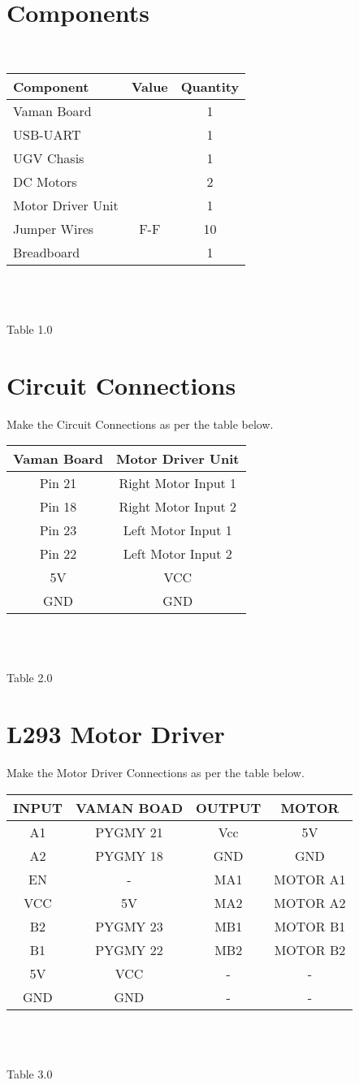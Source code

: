 \documentclass[journal,12pt,twocolumn]{IEEEtran}
\begin{document}
\section{Components}
\
\centering
\begin{tabular}{|l|c|c|}
\hline
Component & Value & Quantity\\
\hline
Vaman Board & & 1\\
\hline
USB-UART & & 1\\
\hline
UGV Chasis & & 1\\
\hline
DC Motors & & 2\\
\hline
Motor Driver Unit &  & 1\\
\hline
Jumper Wires & F-F & 10\\
\hline
Breadboard & & 1\\
\hline
\end{tabular}\\
\
\centerline{Table 1.0}

\section{Circuit Connections}
\raggedright
Make the Circuit Connections as per the table below.\\
\vspace{0.25cm}
\centering
\begin{tabular}{|c|c|}
\hline
Vaman Board & Motor Driver Unit\\
\hline
Pin 21 & Right Motor Input 1\\
\hline
Pin 18 & Right Motor Input 2\\
\hline
Pin 23 & Left Motor Input 1\\
\hline
Pin 22 & Left Motor Input 2\\
\hline
5V & VCC\\
\hline
GND & GND\\
\hline
\end{tabular}\\
\
\centerline{Table 2.0}
\section{L293 Motor Driver}
\raggedright
Make the Motor Driver Connections as per the table below.\\
\vspace{0.25cm}
\centering
\begin{tabular}{|c|c|c|c|}
\hline
INPUT & VAMAN BOAD &OUTPUT & MOTOR \\
\hline
A1 & PYGMY 21 & Vcc & 5V\\
\hline
A2 & PYGMY 18 & GND &GND  \\
\hline
EN & - & MA1 & MOTOR A1\\
\hline
VCC & 5V & MA2 & MOTOR A2\\
\hline
\hline
B2 & PYGMY 23 & MB1 & MOTOR B1\\
\hline
\hline
B1 & PYGMY 22 & MB2 & MOTOR B2\\
\hline
5V & VCC&-&-\\
\hline
GND & GND&-&-\\
\hline
\end{tabular}\\
\
\centerline{Table 3.0}
\end{document}
